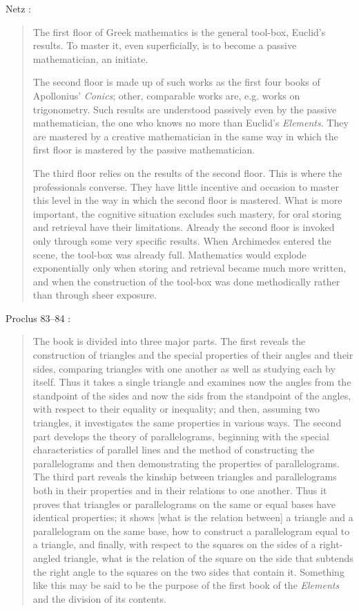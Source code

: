 \documentclass{article}
\begin{document}
Netz \cite[p.~238]{netz}:

\begin{quote}
The first floor of Greek mathematics is the general tool-box,
Euclid's results. To master it, even superficially, is to become a passive
mathematician, an initiate.

The second floor is made up of such works as the first four books of
Apollonius' {\em Conics}; other, comparable works are, e.g. works on trigonometry.
Such results are understood passively even by the passive
mathematician, the one who knows no more than Euclid's {\em Elements}.
They are mastered by a creative mathematician in the same way in
which the first floor is mastered by the passive mathematician.

The third floor relies on the results of the second floor. This is
where the professionals converse. They have little incentive and occasion
to master this level in the way in which the second floor is mastered.
What is more important, the cognitive situation excludes such
mastery, for oral storing and retrieval have their limitations. Already
the second floor is invoked only through some very specific results.
When Archimedes entered the scene, the tool-box was already full.
Mathematics would explode exponentially only when storing and retrieval
became much more written, and when the construction of the
tool-box was done methodically rather than through sheer exposure.
\end{quote}

Proclus 83--84 \cite[pp.~68--69]{proclus}:

\begin{quote}
The book is divided into three major parts. The first reveals
the construction of triangles and the special properties of their
angles and their sides, comparing triangles with one another
as well as studying each by itself. Thus it takes a single triangle
and examines now the angles from the standpoint of the sides
and now the sids from the standpoint of the angles, with 
respect to their equality or inequality; and then, assuming two
triangles, it investigates the same properties in various ways.
The second part develops the theory of parallelograms, beginning
with the special characteristics of parallel lines and
the method of constructing the parallelograms and then
demonstrating the properties of parallelograms. The third part
reveals the kinship between triangles and parallelograms both
in their properties and in their relations to one another. Thus
it proves that triangles or parallelograms on the same or equal
bases have identical properties; it shows [what is the relation
between] a triangle and a parallelogram on the same base,
how to construct a parallelogram equal to a triangle, and
finally, with respect to the squares on the sides of a right-angled
triangle, what is the relation of the square on the side
that subtends the right angle to the squares on the two sides
that contain it. Something like this may be said to be the
purpose of the first book of the {\em Elements} and the division 
of its contents.
\end{quote}
\end{document}
